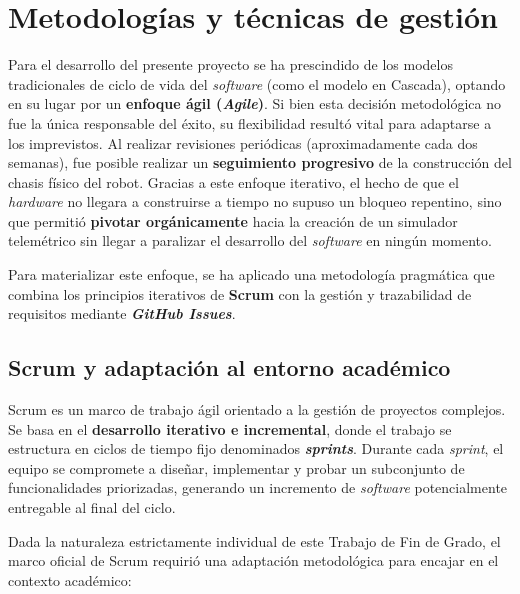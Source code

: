 
\section{Metodologías y técnicas de gestión}

Para el desarrollo del presente proyecto se ha prescindido de los modelos tradicionales de ciclo de vida del \textit{software} (como el modelo en Cascada), optando en su lugar por un \textbf{enfoque ágil (\textit{Agile})}. Si bien esta decisión metodológica no fue la única responsable del éxito, su flexibilidad resultó vital para adaptarse a los imprevistos. Al realizar revisiones periódicas (aproximadamente cada dos semanas), fue posible realizar un \textbf{seguimiento progresivo} de la construcción del chasis físico del robot. Gracias a este enfoque iterativo, el hecho de que el \textit{hardware} no llegara a construirse a tiempo no supuso un bloqueo repentino, sino que permitió \textbf{pivotar orgánicamente} hacia la creación de un simulador telemétrico sin llegar a paralizar el desarrollo del \textit{software} en ningún momento.

Para materializar este enfoque, se ha aplicado una metodología pragmática que combina los principios iterativos de \textbf{Scrum} \cite{scrum} con la gestión y trazabilidad de requisitos mediante \textbf{\textit{GitHub Issues}}.

\subsection{Scrum y adaptación al entorno académico}
Scrum \cite{scrum} es un marco de trabajo ágil orientado a la gestión de proyectos complejos. Se basa en el \textbf{desarrollo iterativo e incremental}, donde el trabajo se estructura en ciclos de tiempo fijo denominados \textbf{\textit{sprints}}. Durante cada \textit{sprint}, el equipo se compromete a diseñar, implementar y probar un subconjunto de funcionalidades priorizadas, generando un incremento de \textit{software} potencialmente entregable al final del ciclo.

Dada la naturaleza estrictamente individual de este Trabajo de Fin de Grado, el marco oficial de Scrum \cite{scrum} requirió una adaptación metodológica para encajar en el contexto académico:


